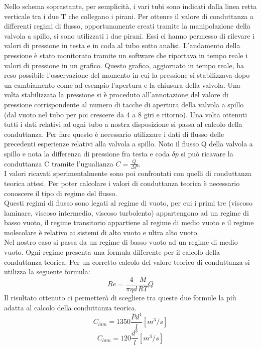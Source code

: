 \documentclass[a4paper,11pt]{article}
\begin{document}
Nello schema soprastante, per semplicità, i vari tubi sono indicati dalla linea retta verticale tra i due T che collegano i pirani.
Per ottenre il valore di conduttanza a differenti regimi di flusso, opportunamente creati tramite la manipolazione della valvola a spillo, si sono utilizzati i due pirani. Essi ci hanno permesso di rilevare i valori di pressione in testa e in coda al tubo sotto analisi. L'andamento della pressione è stato monitorato tramite un software che riportava in tempo reale i valori di pressione in un grafico. Questo grafico, aggiornato in tempo reale, ha reso possibile l'osservazione del momento in cui la pressione si stabilizzava dopo un cambiamento come ad esempio l'apertura e la chiusura della valvola. Una volta stabilizzata la pressione si è proceduto all'annotazione del valore di pressione corrispondente al numero di tacche di apertura della valvola a spillo (dal vuoto nel tubo per poi crescere da 4 a 8 giri e ritorno).
Una volta ottenuti tutti i dati relativi ad ogni tubo a nostra disposizione si passa al calcolo della conduttanza. Per fare questo è necessario utilizzare i dati di flusso delle precedenti esperienze relativi alla valvola a spillo. Noto il flusso Q della valvola a spillo e nota la differenza di pressione fra testa e coda $\delta p$ si può ricavare la conduttanza C tramite l'ugualianza $ C = \frac{Q}{\Delta P} $.\\
I valori ricavati sperimentalmente sono poi confrontati con quelli di conduttanza teorica attesi.
Per poter calcolare i valori di conduttanza teorica è necessario conoscere il tipo di regime del flusso.\\

Questi regimi di flusso sono legati al regime di vuoto, per cui i primi tre (viscoso laminare, viscoso intermedio, viscoso turbolento) appartengono ad un regime di basso vuoto, il regime transitorio appartiene al regime di medio vuoto e il regime molecolare è relativo ai sistemi di alto vuoto e ultra alto vuoto.\\
Nel nostro caso si passa da un regime di basso vuoto ad un regime di medio vuoto. Ogni regime presenta una formula differente per il calcolo della conduttanza teorica.
Per un corretto calcolo del valore teorico di conduttanza si utilizza la seguente formula:
$$ Re=\frac{4}{\pi \eta d}\frac{M}{RT}Q$$
Il risultato ottenuto ci permetterà di scegliere tra queste due formule la più adatta al calcolo della conduttanza teorica.
$$C_{lam}=1350\frac{\bar{P}d^4}{l}[m^3/s]$$
$$C_{lam}=120\frac{d^3}{l}[m^3/s]$$
 
\end{document}
